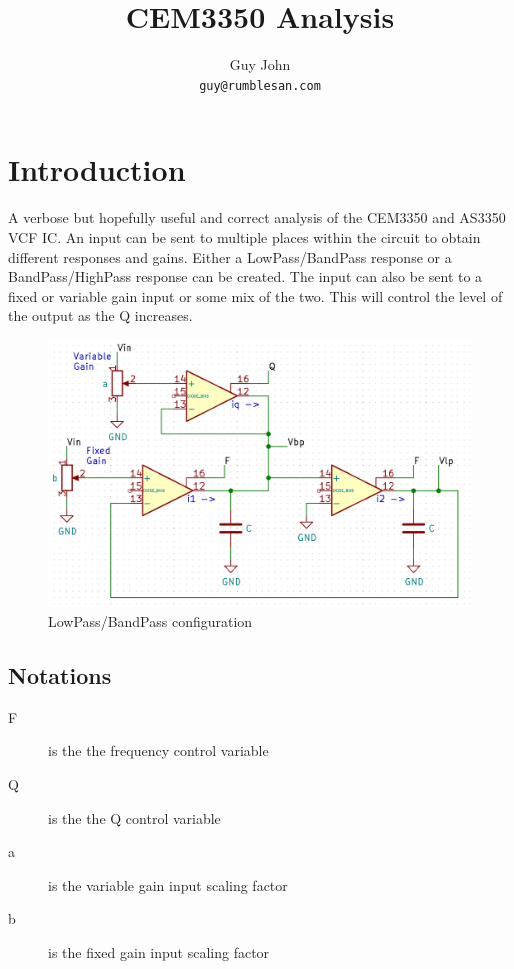 \documentclass{article}
\title{CEM3350 Analysis}
\author{Guy John \\ \texttt{guy@rumblesan.com}}
\begin{document}
\maketitle

\section{Introduction}
A verbose but hopefully useful and correct analysis of the CEM3350 and AS3350 VCF IC\@. An input can be sent to multiple places within the circuit to obtain different responses and gains. Either a LowPass/BandPass response or a BandPass/HighPass response can be created. The input can also be sent to a fixed or variable gain input or some mix of the two. This will control the level of the output as the Q increases.

\begin{figure}[h]
  \includegraphics[width=\linewidth]{lpbp.png}
  \caption{LowPass/BandPass configuration}
\end{figure}

\newpage

\subsection{Notations}

\begin{description}
\item[F] is the the frequency control variable
\item[Q] is the the Q control variable
\item[a] is the variable gain input scaling factor
\item[b] is the fixed gain input scaling factor
\end{description}
\end{document}
